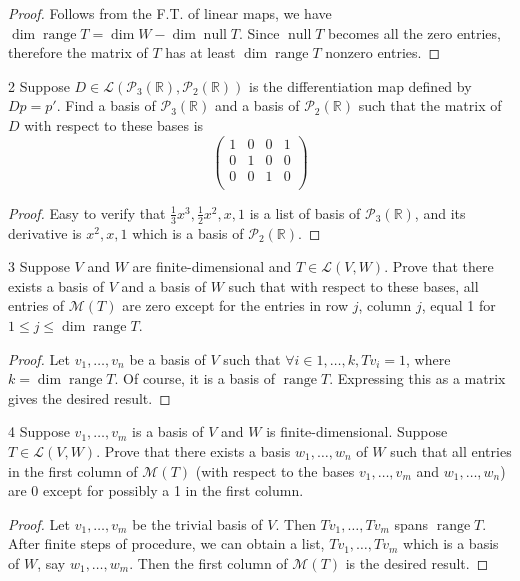 \documentclass{article}
\newenvironment{problem}[1]{\begin{prob*}{#1}{}}{\end{prob*}}
\DeclareMathOperator{\Null}{null}
\DeclareMathOperator{\Range}{range}
\begin{document}
\begin{proof}
	Follows from the F.T. of linear maps, we have \(\dim \Range T = \dim W - \dim \Null T\).
	Since $\Null T$ becomes all the zero entries, therefore
	the matrix of $T$ has at least $\dim \Range T$ nonzero entries.
\end{proof}

\begin{problem}{2}
Suppose $D \in \mathcal{L}(\mathcal{P}_3(\mathbb{R}), \mathcal{P}_2(\mathbb{R}))$ is the differentiation map defined by $Dp = p\prime$. Find a basis of $\mathcal{P}_3(\mathbb{R})$
and a basis of $\mathcal{P}_2(\mathbb{R})$ such that the matrix of $D$ with respect to these bases is
\[
	\begin{pmatrix} 1 & 0 & 0 & 1 \\ 0 & 1 & 0 & 0 \\ 0 & 0 & 1 & 0 \\\end{pmatrix}\]
\end{problem}
\begin{proof}
	Easy to verify that $\frac{1}{3}x^3, \frac{1}{2}x^2, x, 1$ is a list of basis
	of $\mathcal{P}_3(\mathbb{R})$, and its derivative is $x^2, x, 1$ which is a basis of $\mathcal{P}_2(\mathbb{R})$.
\end{proof}

\begin{problem}{3}
Suppose $V$ and $W$ are finite-dimensional and $T \in \mathcal{L}(V,W)$. Prove that there exists a basis of $V$ and a basis of $W$ such that with respect to these bases, all entries of $\mathcal{M}(T)$ are zero except for the entries in row $j$, column $j$, equal 1 for $1 \le j \le \operatorname{dim}\Range T$.
\end{problem}

\begin{proof}
	Let $v_1, \ldots , v_n$ be a basis of $V$ such that $\forall i \in {1, \ldots, k}, Tv_i = 1$,
	where $k = \operatorname{dim}\Range T$.
	Of course, it is a basis of $\Range T$. Expressing this as a matrix gives the desired result.
\end{proof}

\begin{problem}{4}
Suppose $v_1, \ldots ,v_m$ is a basis of $V$ and $W$ is finite-dimensional.
Suppose $T \in \mathcal{L}(V,W)$. Prove that there exists a basis $w_1, \ldots ,w_n$
of $W$ such that all entries in the first column of $\mathcal{M}(T)$ (with respect to
the bases $v_1, \ldots ,v_m$ and $w_1, \ldots ,w_n$) are 0 except for possibly a 1 in
the first column.
\end{problem}
\begin{proof}
	Let $v_1 , \ldots , v_m$ be the trivial basis of $V$. Then $Tv_1, \ldots , Tv_m$ spans $\Range T$. After finite steps of procedure, we can obtain a list, $Tv_1, \ldots ,Tv_m$ which is a basis of $W$, say $w_1, \ldots , w_m$. Then the first column of $\mathcal{M}(T)$ is the desired result.
\end{proof}
\end{document}
